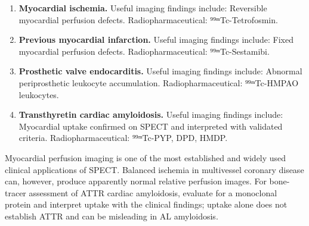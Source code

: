 \begin{enumerate}[leftmargin=*,itemsep=0.45em,topsep=0.4em]
\item \textbf{Myocardial ischemia.} Useful imaging findings include: Reversible myocardial perfusion defects. Radiopharmaceutical: ⁹⁹ᵐTc-Tetrofosmin.
\item \textbf{Previous myocardial infarction.} Useful imaging findings include: Fixed myocardial perfusion defects. Radiopharmaceutical: ⁹⁹ᵐTc-Sestamibi.
\item \textbf{Prosthetic valve endocarditis.} Useful imaging findings include: Abnormal periprosthetic leukocyte accumulation. Radiopharmaceutical: ⁹⁹ᵐTc-HMPAO leukocytes.
\item \textbf{Transthyretin cardiac amyloidosis.} Useful imaging findings include: Myocardial uptake confirmed on SPECT and interpreted with validated criteria. Radiopharmaceutical: ⁹⁹ᵐTc-PYP, DPD, HMDP.
\end{enumerate}
Myocardial perfusion imaging is one of the most established and widely used clinical applications of SPECT. Balanced ischemia in multivessel coronary disease can, however, produce apparently normal relative perfusion images.
For bone-tracer assessment of ATTR cardiac amyloidosis, evaluate for a monoclonal protein and interpret uptake with the clinical findings; uptake alone does not establish ATTR and can be misleading in AL amyloidosis.

